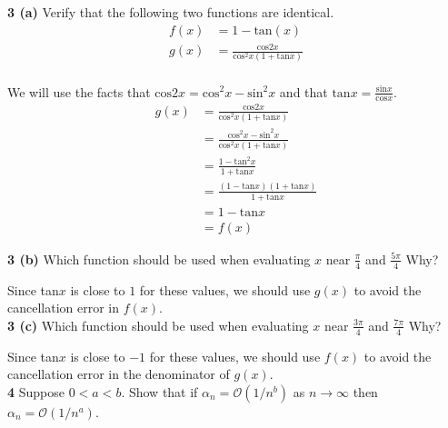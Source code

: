 \documentclass[12pt]{article}
\begin{document}
\hspace{-7 ex}\textbf{3 (a)} Verify that the following two functions are identical.\\
	\begin{align*}
		f(x) & = 1 - \text{tan}(x) \\
		g(x) & = \frac{\text{cos}2x}{\text{cos}^2x(1+\text{tan}x)} \\
	\end{align*}
	
	\bigbreak
	
	We will use the facts that $\text{cos}2x = \text{cos}^2x - \text{sin}^2x$ and that $\text{tan}x = \frac{\text{sin}x}{\text{cos}x}$. \\
	\begin{align*}
		g(x) & = \frac{\text{cos}2x}{\text{cos}^2x(1+\text{tan}x)} \\
		& = \frac{\text{cos}^2x - \text{sin}^2x}{\text{cos}^2x(1+\text{tan}x)} \\
		& = \frac{1 - \text{tan}^2x}{1+\text{tan}x} \\
		& = \frac{(1 - \text{tan}x)(1+\text{tan}x)}{1+\text{tan}x} \\
		& = 1 - \text{tan}x \\
		& = f(x)
	\end{align*}
	
\hspace{-7 ex}\textbf{3 (b)} Which function should be used when evaluating $x$ near $\frac{\pi}{4}$ and $\frac{5\pi}{4}$ Why?\bigbreak

	Since tan$x$ is close to $1$ for these values, we should use $g(x)$ to avoid the cancellation error in $f(x)$. \\

\hspace{-7 ex}\textbf{3 (c)} Which function should be used when evaluating $x$ near $\frac{3\pi}{4}$ and $\frac{7\pi}{4}$ Why?\bigbreak

	Since tan$x$ is close to $-1$ for these values, we should use $f(x)$ to avoid the cancellation error in the denominator of $g(x)$. \\

\hspace{-7 ex}\textbf{4}  Suppose $0 < a < b$. Show that if $\alpha_n = \mathcal{O}(1/n^b)$ as $n \to \infty$ then $\alpha_n = \mathcal{O}(1/n^a)$.\bigbreak
\end{document}
